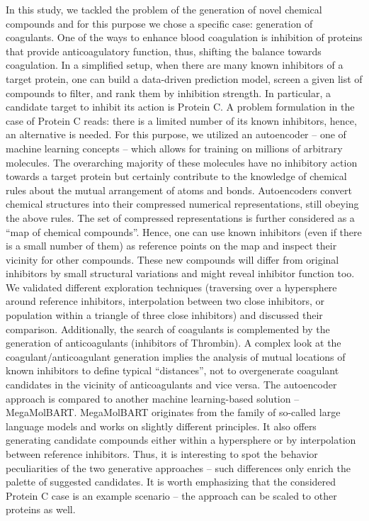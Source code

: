 \documentclass[12pt]{article}
\begin{document}
In this study, we tackled the problem of the generation of novel chemical compounds and for this purpose we chose a specific case: generation of coagulants.
One of the ways to enhance blood coagulation is inhibition of proteins that provide anticoagulatory function, thus, shifting the balance towards coagulation.
In a simplified setup, when there are many known inhibitors of a target protein, one can build a data-driven prediction model, screen a given list of compounds to filter, and rank them by inhibition strength.
In particular, a candidate target to inhibit its action is Protein C.
A problem formulation in the case of Protein C reads: there is a limited number of its known inhibitors, hence, an alternative is needed.
For this purpose, we utilized an autoencoder -- one of machine learning concepts -- which allows for training on millions of arbitrary molecules.
The overarching majority of these molecules have no inhibitory action towards a target protein but certainly contribute to the knowledge of chemical rules about the mutual arrangement of atoms and bonds.
Autoencoders convert chemical structures into their compressed numerical representations, still obeying the above rules.
The set of compressed representations is further considered as a ``map of chemical compounds''.
Hence, one can use known inhibitors (even if there is a small number of them) as reference points on the map and inspect their vicinity for other compounds.
These new compounds will differ from original inhibitors by small structural variations and might reveal inhibitor function too.
We validated different exploration techniques (traversing over a hypersphere around reference inhibitors, interpolation between two close inhibitors, or population within a triangle of three close inhibitors) and discussed their comparison.
Additionally, the search of coagulants is complemented by the generation of anticoagulants (inhibitors of Thrombin).
A complex look at the coagulant/anticoagulant generation implies the analysis of mutual locations of known inhibitors to define typical ``distances'', not to overgenerate coagulant candidates in the vicinity of anticoagulants and vice versa.
The autoencoder approach is compared to another machine learning-based solution -- MegaMolBART.
MegaMolBART originates from the family of so-called large language models and works on slightly different principles.
It also offers generating candidate compounds either within a hypersphere or by interpolation between reference inhibitors.
Thus, it is interesting to spot the behavior peculiarities of the two generative approaches -- such differences only enrich the palette of suggested candidates.
It is worth emphasizing that the considered Protein C case is an example scenario -- the approach can be scaled to other proteins as well.
\end{document}
